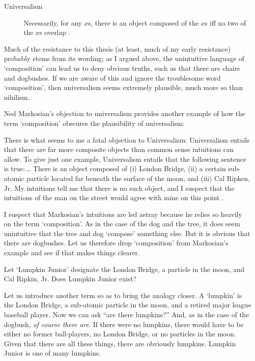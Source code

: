 \documentclass[11pt]{article}
\newenvironment{squote}{%
\begin{spacing}{1}
       	\begin{list}{}{%
\setlength{\labelwidth}{0pt}%
\rightmargin\leftmargin%
}
\item\relax
}{%
\end{list}%
\end{spacing}
}
\begin{document}
\begin{spacing}{1.25}
\begin{description}
\item[Universalism] Necessarily, for any $x$s, there is an object
  composed of the $x$s iff no two of the $x$s overlap
  \citep[227]{markosian1998a}.
\end{description}

Much of the resistance to this thesis (at least, much of my early
resistance) probably stems from its wording; as I argued above, the
unintuitive language of `composition' can lead us to deny obvious
truths, such as that there are chairs and dogbushes.  If we are aware
of this and ignore the troublesome word `composition', then
universalism seems extremely plausible, much more so than nihilism.

Ned Markosian's objection to universalism provides another example of
how the term `composition' obscures the plausibility of universalism:

\begin{squote}
There is what seems to me a fatal objection to Universalism:
Universalism entails that there are far more composite objects than
common sense intuitions can allow.  To give just one example,
Universalism entails that the following sentence is true:\,\ldots
There is an object composed of (i) London Bridge, (ii) a certain
sub-atomic particle located far beneath the surface of the moon, and
(iii) Cal Ripken, Jr.  My intuitions tell me that there is no such
object, and I suspect that the intuitions of the man on the street
would agree with mine on this point \citeyearpar[228]{markosian1998a}.
\end{squote}

I suspect that Markosian's intuitions are led astray because he relies
so heavily on the term `composition'.  As in the case of the dog and
the tree, it does seem unintuitive that the tree and dog `compose'
something else.  But it is obvious that there are dogbushes.  Let us
therefore drop `composition' from Markosian's example and see if that
makes things clearer.

Let `Lumpkin Junior' designate the London Bridge, a particle in the
moon, and Cal Ripkin, Jr.  Does Lumpkin Junior exist?

Let us introduce another term so as to bring the analogy closer.  A
`lumpkin' is the London Bridge, a sub-atomic particle in the moon, and
a retired major league baseball player.  Now we can ask ``are there
lumpkins?''  And, as in the case of the dogbush, {\em of course there
  are}.  If there were no lumpkins, there would have to be either no
former ball-players, no London Bridge, or no particles in the moon.
Given that there are all these things, there are obviously lumpkins.
Lumpkin Junior is one of many lumpkins.


\end{spacing}
\end{document}
